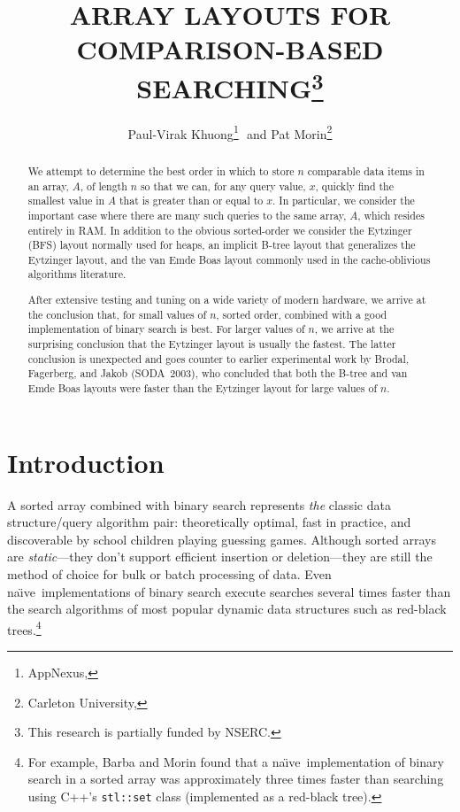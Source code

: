 \documentclass{patmorin}
\title{\MakeUppercase{Array Layouts for Comparison-Based Searching}\thanks{This research is partially funded by NSERC.}}
\author{Paul-Virak Khuong\footnote{AppNexus, \email{pvk@pvk.ca}}\,\, 
    and Pat Morin\footnote{Carleton University, \email{morin@scs.carleton.ca}}}
\newcommand{\naive}{na\"{\i}ve}
\begin{document}
\begin{titlepage}
\maketitle


\begin{abstract}
  We attempt to determine the best order in which to store $n$ comparable
  data items in an array, $A$, of length $n$ so that we can, for any query
  value, $x$, quickly find the smallest value in $A$ that is greater
  than or equal to $x$. In particular, we consider the important case
  where there are many such queries to the same array, $A$, which resides
  entirely in RAM.  In addition to the obvious sorted-order we consider
  the Eytzinger (BFS) layout normally used for heaps, an implicit B-tree
  layout that generalizes the Eytzinger layout, and the van Emde Boas
  layout commonly used in the cache-oblivious algorithms literature.

  After extensive testing and tuning on a wide variety of modern hardware,
  we arrive at the conclusion that, for small values of $n$, sorted
  order, combined with a good implementation of binary search is best.
  For larger values of $n$, we arrive at the surprising conclusion that
  the Eytzinger layout is usually the fastest.  The latter conclusion is
  unexpected and goes counter to earlier experimental work by Brodal,
  Fagerberg, and Jakob (SODA~2003), who concluded that both the B-tree
  and van Emde Boas layouts were faster than the Eytzinger layout for
  large values of $n$.
\end{abstract}

\end{titlepage}

\tableofcontents
\newpage

\section{Introduction}

A sorted array combined with binary search represents \emph{the} classic
data structure/query algorithm pair: theoretically optimal, fast in
practice, and discoverable by school children playing guessing games.
Although sorted arrays are \emph{static}---they don't support efficient
insertion or deletion---they are still the method of choice for bulk or
batch processing of data. Even \naive\ implementations of binary search
execute searches several times faster than the search algorithms of most
popular dynamic data structures such as red-black trees.\footnote{For
example, Barba and Morin \cite{barba.morin:top-down} found that a \naive\
implementation of binary search in a sorted array was approximately
three times faster than searching using C++'s \texttt{stl::set} class
(implemented as a red-black tree).}
\end{document}
